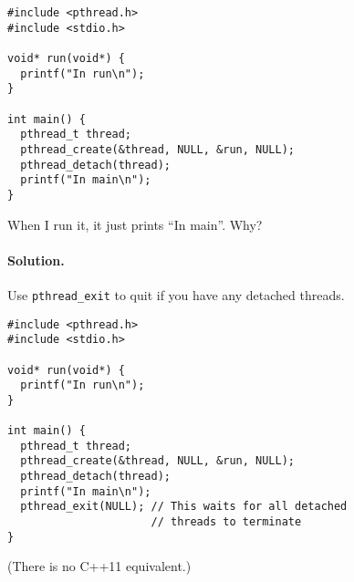 \documentclass[11pt]{article}
\begin{document}
\begin{lstlisting}
#include <pthread.h>
#include <stdio.h>

void* run(void*) {
  printf("In run\n");
}

int main() {
  pthread_t thread;
  pthread_create(&thread, NULL, &run, NULL);
  pthread_detach(thread);
  printf("In main\n");
}
\end{lstlisting}

  When I run it, it just prints ``In main''. Why?

\paragraph{Solution.} Use {\tt pthread\_exit} to quit if you have any detached threads.
  \begin{lstlisting}
#include <pthread.h>
#include <stdio.h>

void* run(void*) {
  printf("In run\n");
}

int main() {
  pthread_t thread;
  pthread_create(&thread, NULL, &run, NULL);
  pthread_detach(thread);
  printf("In main\n");
  pthread_exit(NULL); // This waits for all detached
                      // threads to terminate
}
  \end{lstlisting}
(There is no C++11 equivalent.)





\end{document}
